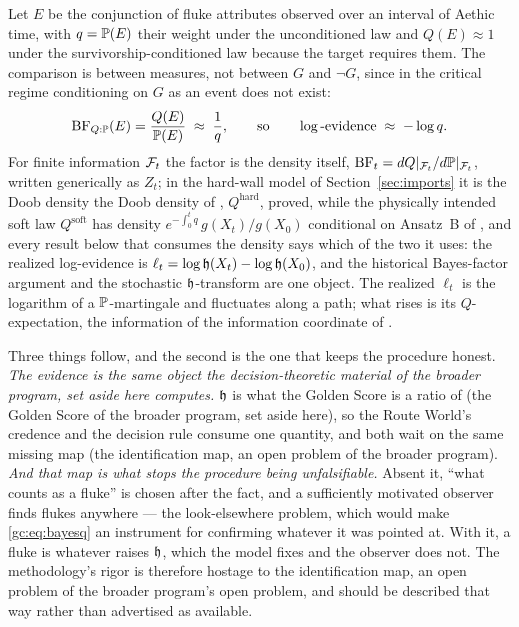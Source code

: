 \begin{proposition}\label{gc:prop:credence}
Let $E$ be the conjunction of fluke attributes observed over an interval
of Aethic time, with $q=\mathbb{P}(E)$ their weight under the unconditioned
law and $Q(E)\approx1$ under the survivorship-conditioned law because
the target requires them. The comparison is between measures, not
between $G$ and $\neg G$, since in the critical regime conditioning on
$G$ as an event does not exist:
\begin{equation}\label{gc:eq:bayesq}
\mathrm{BF}_{Q:\mathbb{P}}(E)=\frac{Q(E)}{\mathbb{P}(E)}\;\approx\;\frac1q,
\qquad\text{so}\qquad
\log\text{-evidence}\;\approx\;-\log q .
\end{equation}
For finite information $\mathcal{F}_t$ the factor is the density itself,
$\mathrm{BF}_t=dQ|_{\mathcal{F}_t}/d\mathbb{P}|_{\mathcal{F}_t}$, written generically as
$Z_t$; in the hard-wall model of Section~\ref{sec:imports} it is the Doob
density the Doob density of \cite{GoldenSurvivorship}, $Q^{\mathrm{hard}}$, proved, while the
physically intended soft law $Q^{\mathrm{soft}}$ has density
$e^{-\int_0^tq}\,g(X_t)/g(X_0)$ conditional on Ansatz~B of \cite{GoldenSurvivorship},
and every result below that consumes the density says which of the two
it uses: the
realized log-evidence is $\ell_t=\log\mathfrak{h}(X_t)-\log\mathfrak{h}(X_0)$, and the
historical Bayes-factor argument and the stochastic $\mathfrak{h}$-transform are
one object. The realized $\ell_t$ is the logarithm of a
$\mathbb{P}$-martingale and fluctuates along a path; what rises is its
$Q$-expectation, the information of the information coordinate of \cite{GoldenTargeted}.
\end{proposition}

Three things follow, and the second is the one that keeps the procedure
honest. \emph{The evidence is the same object the decision-theoretic material of the broader program, set aside here computes.} $\mathfrak{h}$ is
what the Golden Score is a ratio of (the Golden Score of the broader program, set aside here),
so the Route World's credence and the decision rule consume one
quantity, and both wait on the same missing map
(the identification map, an open problem of the broader program). \emph{And that map is what stops the procedure being unfalsifiable.}
Absent it, ``what counts as a fluke'' is chosen after the fact, and a
sufficiently motivated observer finds flukes anywhere --- the
look-elsewhere problem, which would make \eqref{gc:eq:bayesq} an
instrument for confirming whatever it was pointed at. With it, a fluke
is whatever raises $\mathfrak{h}$, which the model fixes and the observer does
not. The methodology's rigor is therefore hostage to
the identification map, an open problem of the broader program's open problem, and should be described that way
rather than advertised as available.

